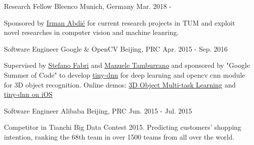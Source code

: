


\begin{cventries}


\cventry
{Research Fellow} %
{Bleenco} %
{Munich, Germany} %
{Mar. 2018 - } %
{ %
\begin{cvitems}
\item {Sponsored by \href{https://www.linkedin.com/in/irmanabdic/?originalSubdomain=de}{Irman Abdić} for current research projects in TUM and exploit novel researches in computer vision and machine leanring.}
\end{cvitems}
}

\cventry
{Software Engineer} %
{Google \& OpenCV} %
{Beijing, PRC} %
{Apr. 2015 - Sep. 2016} %
{ %
\begin{cvitems}
\item {Supervised by \href{https://www.linkedin.com/in/stefano-fabri-16a73748}{Stefano Fabri} and \href{https://www.linkedin.com/in/manuele-tamburrano-b82384a5?authType=name&authToken=Di5p&trk=prof-sb-browse_map-name}{Manuele Tamburrano} and sponsored by "Google Summer of Code" to develop \href{https://github.com/tiny-dnn/tiny-dnn}{tiny-dnn} for deep learning and opencv cnn module for 3D object recognition.
Online demos: \href{https://www.youtube.com/watch?v=Mc20rTYdXTE}{3D Object Multi-task Learning} and \href{https://drive.google.com/open?id=0B-RYa1FDOrYXVUEzcG1mdnl5a3M}{tiny-dnn on iOS}
}
\end{cvitems}
}


\cventry
{Software Engineer} %
{Alibaba} %
{Beijing, PRC} %
{Jun. 2015 - Jul. 2015} %
{ %
\begin{cvitems}
\item {Competitor in Tianchi Big Data Contest 2015. Predicting customers’ shopping intention, ranking the 68th team in over 1500 teams from all over the world.}
\end{cvitems}
}


\end{cventries}
